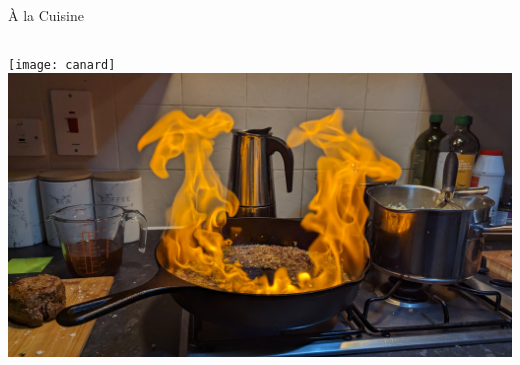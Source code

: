 \documentclass[10pt]{beamer}
\begin{document}
\begin{frame}{\`A la Cuisine}
\begin{columns}
      \vspace{0.2cm}
      \texttt{[image: canard]}\\
      \vspace{0.2cm}
      \includegraphics[width=\textwidth]{flambe}
    \end{columns}
  \end{frame}
\end{document}
